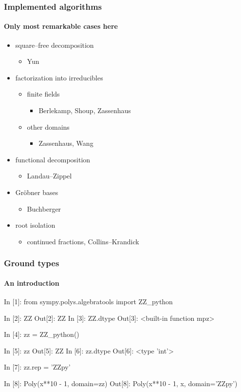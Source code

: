 \documentclass{beamer}
\begin{document}
\begin{frame}
    \frametitle{Implemented algorithms}
    \framesubtitle{Only most remarkable cases here}

    \begin{itemize}
        \item square--free decomposition
            \begin{itemize}
                \item Yun
            \end{itemize}
        \item factorization into irreducibles
            \begin{itemize}
                \item finite fields
                    \begin{itemize}
                        \item Berlekamp, Shoup, Zassenhaus
                    \end{itemize}
                \item other domains
                    \begin{itemize}
                        \item Zassenhaus, Wang
                    \end{itemize}
            \end{itemize}
        \item functional decomposition
            \begin{itemize}
                \item Landau--Zippel
            \end{itemize}
        \item Gr\"{o}bner bases
            \begin{itemize}
                \item Buchberger
            \end{itemize}
        \item root isolation
            \begin{itemize}
                \item continued fractions, Collins--Krandick
            \end{itemize}
    \end{itemize}
\end{frame}

\begin{frame}[fragile]
    \frametitle{Ground types}
    \framesubtitle{An introduction}

    \begin{python}
In [1]: from sympy.polys.algebratools import ZZ_python

In [2]: ZZ
Out[2]: ZZ
In [3]: ZZ.dtype
Out[3]: <built-in function mpz>

In [4]: zz = ZZ_python()

In [5]: zz
Out[5]: ZZ
In [6]: zz.dtype
Out[6]: <type 'int'>

In [7]: zz.rep = 'ZZpy'

In [8]: Poly(x**10 - 1, domain=zz)
Out[8]: Poly(x**10 - 1, x, domain='ZZpy')
    \end{python}
\end{frame}
\end{document}
